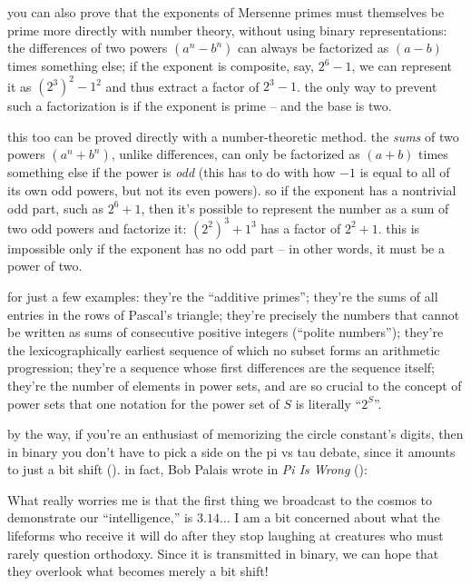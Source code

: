 \documentclass[../footnotes.tex]{subfiles}
\begin{document}
\myfootnote{} you can also prove that the exponents of Mersenne primes must themselves be prime more directly with number theory, without using binary representations: the differences of two powers $(a^n - b^n)$ can always be factorized as $(a - b)$ times something else; if the exponent is composite, say, $2^6 - 1$, we can represent it as $(2^3)^2 - 1^2$ and thus extract a factor of $2^3 - 1$. the only way to prevent such a factorization is if the exponent is prime -- and the base is two.

\myfootnote{} this too can be proved directly with a number-theoretic method. the \emph{sums} of two powers $(a^n + b^n)$, unlike differences, can only be factorized as $(a + b)$ times something else if the power is \emph{odd} (this has to do with how $-1$ is equal to all of its own odd powers, but not its even powers). so if the exponent has a nontrivial odd part, such as $2^6 + 1$, then it's possible to represent the number as a sum of two odd powers and factorize it: $(2^2)^3 + 1^3$ has a factor of $2^2 + 1$. this is impossible only if the exponent has no odd part -- in other words, it must be a power of two.

\myfootnote{} for just a few examples: they're the ``additive primes''; they're the sums of all entries in the rows of Pascal's triangle; they're precisely the numbers that cannot be written as sums of consecutive positive integers (``polite numbers''); they're the lexicographically earliest sequence of which no subset forms an arithmetic progression; they're a sequence whose first differences are the sequence itself; they're the number of elements in power sets, and are so crucial to the concept of power sets that one notation for the power set of $S$ is literally ``$2^S$''.

\myfootnote{} by the way, if you're an enthusiast of memorizing the circle constant's digits, then in binary you don't have to pick a side on the pi vs tau debate, since it amounts to just a bit shift (). in fact, Bob Palais wrote in {\it Pi Is Wrong} ():

\begin{quoting}
	What really worries me is that the first thing we broadcast to the cosmos to demonstrate our ``intelligence,'' is $3.14 \ldots$ I am a bit concerned about what the lifeforms who receive it will do after they stop laughing at creatures who must rarely question orthodoxy. Since it is transmitted in binary, we can hope that they overlook what becomes merely a bit shift!
\end{quoting}
\end{document}
